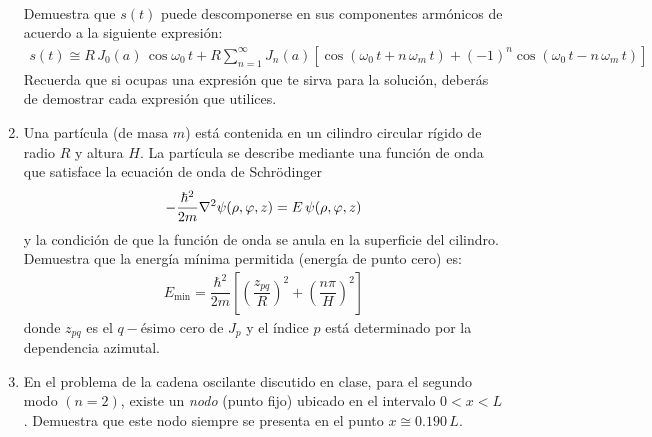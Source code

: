 \begin{enumerate}
\begin{align*}
\end{align*}
Demuestra que $s(t)$ puede descomponerse en sus componentes armónicos de acuerdo a la siguiente expresión:
\begin{align*}
s(t) \cong R \, J_{0}(a) \, \cos \omega_{0} \, t + R \sum_{n=1}^{\infty} J_{n} (a) [\cos (\omega_{0} \, t + n \, \omega_{m} \, t) + (-1)^{n} \cos (\omega_{0} \, t - n \, \omega_{m} \, t) ]
\end{align*}
Recuerda que si ocupas una expresión que te sirva para la solución, deberás de demostrar cada expresión que utilices.
\item Una partícula (de masa $m$) está contenida en un cilindro circular rígido de radio $R$ y altura $H$. La partícula se describe mediante una función de onda que satisface la ecuación de onda de Schrödinger
\begin{align*}
- \dfrac{\hbar^{2}}{2 m} \laplacian \psi(\rho, \varphi, z) = E \, \psi(\rho, \varphi, z)
\end{align*}
y la condición de que la función de onda se anula en la superficie del cilindro. Demuestra que la energía mínima permitida (energía de punto cero) es:
\begin{align*}
E_{\text{min}} = \dfrac{\hbar^{2}}{2 m} \left[ \left( \dfrac{z_{pq}}{R} \right)^{2} + \left( \dfrac{n \pi}{H} \right)^{2} \right]
\end{align*}
donde $z_{pq}$ es el $q-$ésimo cero de $J_{p}$ y el índice $p$ está determinado por la dependencia azimutal.
\item En el problema de la cadena oscilante discutido en clase, para el segundo modo $(n=2)$, existe un \emph{nodo} (punto fijo) ubicado en el intervalo $0 < x < L$. Demuestra que este nodo siempre se presenta en el punto $x \cong 0.190 \, L$.
\end{enumerate}
